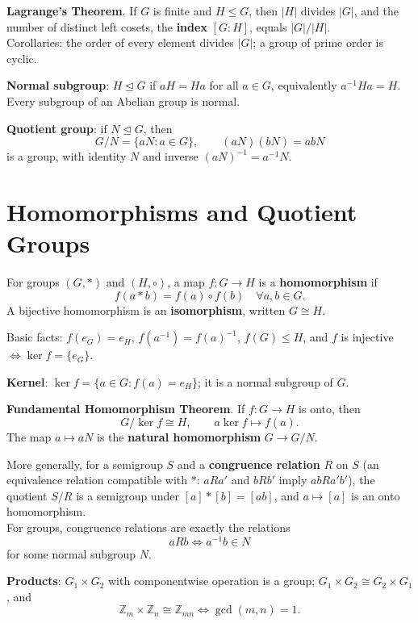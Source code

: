 \documentclass[12pt, a4paper, UTF8, openany]{ctexbook}
\newcommand{\field}[1]{\mathbb{#1}}%
\begin{document}
        \textbf{Lagrange's Theorem}. If $G$ is finite and $H \leqslant G$, then $|H|$ divides $|G|$, and the number of distinct left cosets, the \textbf{index} $[G : H]$, equals $|G| / |H|$. \\
        Corollaries: the order of every element divides $|G|$; a group of prime order is cyclic.

        \textbf{Normal subgroup}: $H \trianglelefteq G$ if $aH = Ha$ for all $a \in G$, equivalently $a^{-1}Ha = H$. Every subgroup of an Abelian group is normal.

        \textbf{Quotient group}: if $N \trianglelefteq G$, then
        $$ G/N = \{aN : a \in G\}, \qquad (aN)(bN) = abN $$
        is a group, with identity $N$ and inverse $(aN)^{-1} = a^{-1}N$.

    \section{Homomorphisms and Quotient Groups}
        For groups $(G, *)$ and $(H, \circ)$, a map $f: G \to H$ is a \textbf{homomorphism} if
        $$ f(a * b) = f(a) \circ f(b) \quad \forall a, b \in G. $$
        A bijective homomorphism is an \textbf{isomorphism}, written $G \cong H$.

        Basic facts: $f(e_G) = e_H$, $f(a^{-1}) = f(a)^{-1}$, $f(G) \leqslant H$, and $f$ is injective $\iff \ker f = \{e_G\}$.

        \textbf{Kernel}: $\ker f = \{a \in G : f(a) = e_H\}$; it is a normal subgroup of $G$.

        \textbf{Fundamental Homomorphism Theorem}. If $f: G \to H$ is onto, then
        $$ G / \ker f \cong H, \qquad a \ker f \mapsto f(a). $$
        The map $a \mapsto aN$ is the \textbf{natural homomorphism} $G \to G/N$.

        More generally, for a semigroup $S$ and a \textbf{congruence relation} $R$ on $S$ (an equivalence relation compatible with $*$: $a R a'$ and $b R b'$ imply $ab R a'b'$), the quotient $S/R$ is a semigroup under $[a] * [b] = [ab]$, and $a \mapsto [a]$ is an onto homomorphism. \\
        For groups, congruence relations are exactly the relations
        $$ a R b \iff a^{-1}b \in N $$
        for some normal subgroup $N$.

        \textbf{Products}: $G_1 \times G_2$ with componentwise operation is a group; $G_1 \times G_2 \cong G_2 \times G_1$, and
        $$ \field{Z}_m \times \field{Z}_n \cong \field{Z}_{mn} \iff \gcd(m, n) = 1. $$
\end{document}

